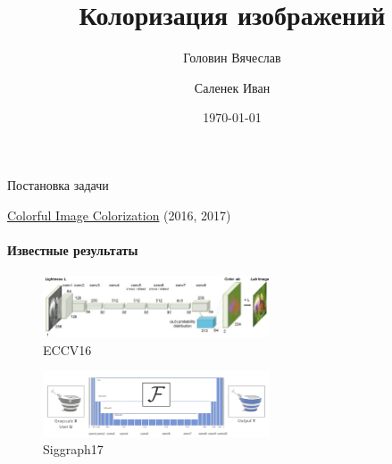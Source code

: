 \documentclass[aspectratio=169]{beamer}
\title[Заголовок]{Колоризация изображений}
\author{Головин Вячеслав \and Саленек Иван}
\date{\today}
\begin{document}
\renewcommand{\inserttotalframenumber}{5}   %

\frame[plain]{\titlepage}	%

\begin{frame}{Постановка задачи}
\end{frame}

\begin{frame}{\href{https://github.com/richzhang/colorization}{Colorful Image Colorization} (2016, 2017)}
\framesubtitle{Известные результаты}
        \begin{figure}
            \includegraphics[width=0.6\textwidth]{eccv16.png}
            \caption*{ECCV16}
        \end{figure}

        \begin{figure}
            \includegraphics[width=0.6\textwidth]{siggraph17_white.png}
            \caption*{Siggraph17}
        \end{figure}
\end{frame}
\end{document}
